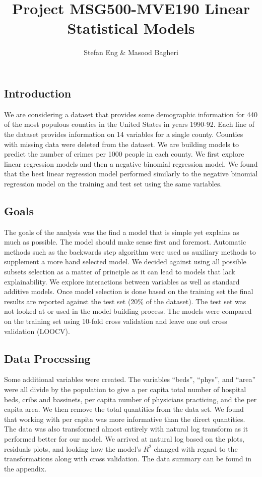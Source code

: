 \documentclass[]{article}
\title{Project MSG500-MVE190 Linear Statistical Models}
\author{Stefan Eng \& Masood Bagheri}
\date{}
\begin{document}
\maketitle

\subsection{Introduction}\label{introduction}

We are considering a dataset that provides some demographic information
for 440 of the most populous counties in the United States in years
1990-92. Each line of the dataset provides information on 14 variables
for a single county. Counties with missing data were deleted from the
dataset. We are building models to predict the number of crimes per 1000
people in each county. We first explore linear regression models and
then a negative binomial regression model. We found that the best linear
regression model performed similarly to the negative binomial regression
model on the training and test set using the same variables.

\subsection{Goals}\label{goals}

The goals of the analysis was the find a model that is simple yet
explains as much as possible. The model should make sense first and
foremost. Automatic methods such as the backwards step algorithm were
used as auxiliary methods to supplement a more hand selected model. We
decided against using all possible subsets selection as a matter of
principle as it can lead to models that lack explainability. We explore
interactions between variables as well as standard additive models. Once
model selection is done based on the training set the final results are
reported against the test set (20\% of the dataset). The test set was
not looked at or used in the model building process. The models were
compared on the training set using 10-fold cross validation and leave
one out cross validation (LOOCV).

\subsection{Data Processing}\label{data-processing}

Some additional variables were created. The variables ``beds'',
``phys'', and ``area'' were all divide by the population to give a per
capita total number of hospital beds, cribs and bassinets, per capita
number of physicians practicing, and the per capita area. We then remove
the total quantities from the data set. We found that working with per
capita was more informative than the direct quantities. The data was
also transformed almost entirely with natural log transform as it
performed better for our model. We arrived at natural log based on the
plots, residuals plots, and looking how the model's \(R^2\) changed with
regard to the transformations along with cross validation. The data
summary can be found in the appendix.
\end{document}
